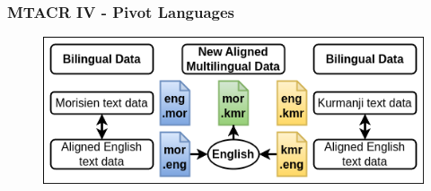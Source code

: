 \documentclass[aspectratio=169]{beamer}
\begin{document}
\begin{frame}[fragile]
	\frametitle{MTACR IV - Pivot Languages}
    \begin{figure}
	    \centering
	    \includegraphics[width=1.0\textwidth]{images/CRAMT-Tool-TextAlignments.png}
	\end{figure}
\end{frame}
\end{document}
